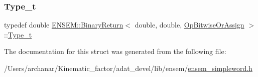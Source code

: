 \mbox{\label{structENSEM_1_1BinaryReturn_3_01double_00_01double_00_01OpBitwiseOrAssign_01_4_a28cf6b687041196193aa5c2f774eb33b}} 
\subsubsection{\texorpdfstring{Type\_t}{Type\_t}\hspace{0.1cm}{\footnotesize\ttfamily [2/2]}}
{\footnotesize\ttfamily typedef double \mbox{\hyperlink{structENSEM_1_1BinaryReturn}{E\+N\+S\+E\+M\+::\+Binary\+Return}}$<$ double, double, \mbox{\hyperlink{structENSEM_1_1OpBitwiseOrAssign}{Op\+Bitwise\+Or\+Assign}} $>$\+::\mbox{\hyperlink{structENSEM_1_1BinaryReturn_3_01double_00_01double_00_01OpBitwiseOrAssign_01_4_a28cf6b687041196193aa5c2f774eb33b}{Type\+\_\+t}}}



The documentation for this struct was generated from the following file\+:\begin{DoxyCompactItemize}
\item 
/\+Users/archanar/\+Kinematic\+\_\+factor/adat\+\_\+devel/lib/ensem/\mbox{\hyperlink{lib_2ensem_2ensem__simpleword_8h}{ensem\+\_\+simpleword.\+h}}\end{DoxyCompactItemize}
